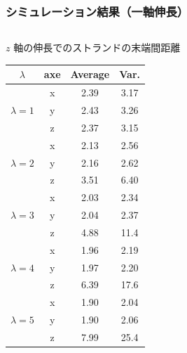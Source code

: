 \documentclass[11pt, dvipdfmx]{beamer}
\begin{document}
\begin{frame}
\frametitle{シミュレーション結果（一軸伸長）}
\begin{columns}[totalwidth=\linewidth]
\vspace{-2mm}
\small
\begin{exampleblock}{$z$ 軸の伸長でのストランドの末端間距離}
\vspace{2mm}
\scriptsize
\begin{table}
\begin{tabular}{cccc} \hline
$\lambda$	& axe	& Average	&Var. 		\\ \hline \hline
			&x		&2.39		&	3.17	\\ %
$\lambda=1$	&y		&2.43		&	3.26	\\ %
			&z		&2.37		&	3.15	\\ \hline
			&x		&2.13		&	2.56	\\ %
$\lambda=2$	&y		&2.16		&	2.62	\\ %
			&z		&3.51		&	6.40	\\ \hline
			&x		&2.03		&	2.34	\\ %
$\lambda=3$	&y		&2.04		&	2.37	\\
			&z		&4.88		&	11.4	\\ \hline
			&x		&1.96		&	2.19	\\
$\lambda=4$	&y		&1.97		&	2.20	\\
			&z		&6.39		&	17.6	\\ \hline
			&x 		&1.90		&	2.04	\\
$\lambda=5$	&y		&1.90		&	2.06	\\
			&z		&7.99		&	25.4	\\ \hline
\end{tabular}
\end{table}
\end{exampleblock}
\vspace{-6mm}
\begin{figure}

\end{figure}
\end{columns}
\end{frame}
\end{document}
